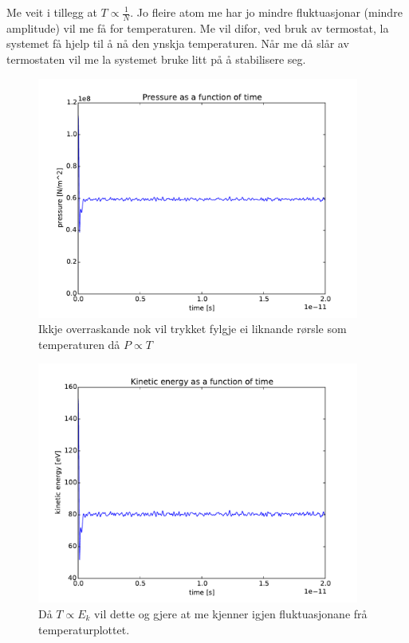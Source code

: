 \documentclass[12pt, a4paper]{article}
\theoremstyle{definition} \newtheorem*{definition}{Teorem}
\begin{document}
            Me veit i tillegg at $T \propto \frac{1}{N}$. Jo fleire atom me har jo mindre fluktuasjonar (mindre amplitude) vil me få for temperaturen.
            Me vil difor, ved bruk av termostat, la systemet få hjelp til å nå den ynskja temperaturen. Når me då slår av termostaten vil me la systemet bruke litt på å 
            stabilisere seg.
            \begin{figure}[H]
                \centering
                \includegraphics[width=400px]{pressure.pdf}
                \caption{Ikkje overraskande nok vil trykket fylgje ei liknande rørsle som temperaturen då $P \propto T$}
            \end{figure}
            \begin{figure}[H]
                \centering
                \includegraphics[width=400px]{kineticEnergy.pdf}
                \caption{Då $T \propto E_k$ vil dette og gjere at me kjenner igjen fluktuasjonane frå temperaturplottet.}
            \end{figure}
\end{document}
